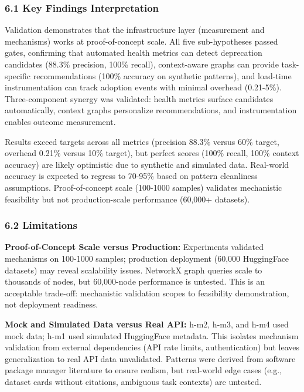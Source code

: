 
\subsubsection{6.1 Key Findings Interpretation}

Validation demonstrates that the infrastructure layer (measurement and mechanisms) works at proof-of-concept scale. All five sub-hypotheses passed gates, confirming that automated health metrics can detect deprecation candidates (88.3\% precision, 100\% recall), context-aware graphs can provide task-specific recommendations (100\% accuracy on synthetic patterns), and load-time instrumentation can track adoption events with minimal overhead (0.21-5\%). Three-component synergy was validated: health metrics surface candidates automatically, context graphs personalize recommendations, and instrumentation enables outcome measurement.

Results exceed targets across all metrics (precision 88.3\% versus 60\% target, overhead 0.21\% versus 10\% target), but perfect scores (100\% recall, 100\% context accuracy) are likely optimistic due to synthetic and simulated data. Real-world accuracy is expected to regress to 70-95\% based on pattern cleanliness assumptions. Proof-of-concept scale (100-1000 samples) validates mechanistic feasibility but not production-scale performance (60,000+ datasets).

\subsubsection{6.2 Limitations}

\textbf{Proof-of-Concept Scale versus Production:} Experiments validated mechanisms on 100-1000 samples; production deployment (60,000 HuggingFace datasets) may reveal scalability issues. NetworkX graph queries scale to thousands of nodes, but 60,000-node performance is untested. This is an acceptable trade-off: mechanistic validation scopes to feasibility demonstration, not deployment readiness.

\textbf{Mock and Simulated Data versus Real API:} h-m2, h-m3, and h-m4 used mock data; h-m1 used simulated HuggingFace metadata. This isolates mechanism validation from external dependencies (API rate limits, authentication) but leaves generalization to real API data unvalidated. Patterns were derived from software package manager literature to ensure realism, but real-world edge cases (e.g., dataset cards without citations, ambiguous task contexts) are untested.


